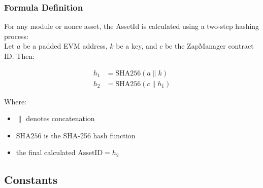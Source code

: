 \subsubsection{Formula Definition}
For any module or nonce asset, the AssetId is calculated using a two-step hashing process:\\

Let $a$ be a padded EVM address, $k$ be a key, and $c$ be the ZapManager contract ID. Then:

\begin{align*}
h_1 &= \text{SHA256}(a \parallel k) \\
h_2 &= \text{SHA256}(c \parallel h_1)
\end{align*}

Where:
\begin{itemize}
    \item $\parallel$ denotes concatenation
    \item $\text{SHA256}$ is the SHA-256 hash function
    \item the final calculated $\text{AssetID} = h_2$
\end{itemize}





\subsection{Constants}

